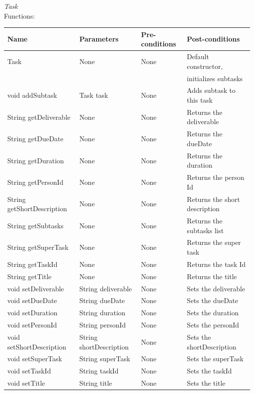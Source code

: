 \emph{Task}\\
Functions:\\
\begin{tabular}{| l | l | l | l |}
\hline
Name & Parameters & Pre-conditions & Post-conditions\\
\hline
		Task				& None       			& None			& Default constructor, \\
						& 	       			& 			& initializes subtasks \\
\hline
		void addSubtask		& Task task			& None       	 	& Adds subtask to this task \\
\hline
		String getDeliverable		& None				& None       	 	& Returns the deliverable \\
\hline
		String getDueDate		& None				& None       	 	& Returns the dueDate \\
\hline
		String getDuration		& None				& None       	 	& Returns the duration \\
\hline
		String getPersonId		& None				& None       	 	& Returns the person Id \\
\hline
		String getShortDescription	& None				& None       	 	& Returns the short description \\
\hline
		String getSubtasks		& None				& None       	 	& Returns the subtasks list \\
\hline
		String getSuperTask		& None				& None       	 	& Returns the super task \\
\hline
		String getTaskId		& None		  		& None			& Returns the task Id \\
\hline
		String getTitle			& None				& None       	 	& Returns the title \\
\hline
		void setDeliverable		& String deliverable		& None       	 	& Sets the deliverable \\
\hline
		void setDueDate		& String dueDate		& None       	 	& Sets the dueDate \\
\hline
		void setDuration		& String duration		& None       	 	& Sets the duration \\
\hline
		void setPersonId		& String personId		& None       	 	& Sets the personId\\
\hline
		void setShortDescription	& String shortDescription	& None       	 	& Sets the shortDescription\\ 
\hline
		void setSuperTask		& String superTask		& None       	 	& Sets the superTask \\
\hline
		void setTaskId			& String taskId	  		& None			& Sets the taskId \\
\hline
		void setTitle			& String title			& None       	 	& Sets the title
\\
\hline
\end{tabular}
\\

